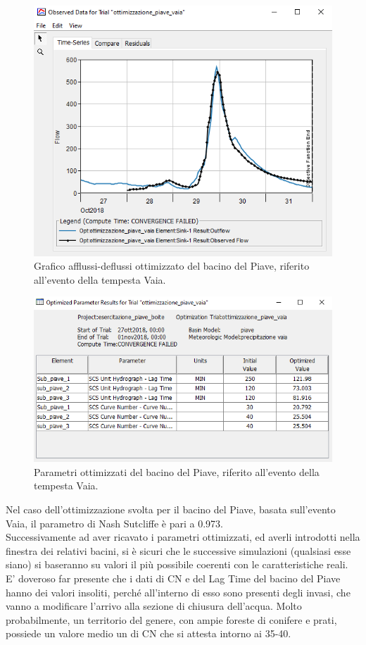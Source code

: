 \begin{figure}[H]\centering
    \includegraphics[scale=1]{immagini/ottim_piave.PNG}
    \caption{Grafico afflussi-deflussi ottimizzato del bacino del Piave, riferito all'evento della tempesta Vaia.}
        \label{ottim_piave}    
\end{figure}

\begin{figure}[H]\centering
    \includegraphics[scale=1]{immagini/par_ottimiz_piave.PNG}
    \caption{Parametri ottimizzati del bacino del Piave, riferito all'evento della tempesta Vaia.}
        \label{par_ottim_boite}    
    \end{figure}

Nel caso dell'ottimizzazione svolta per il bacino del Piave, basata sull'evento Vaia, il parametro di Nash Sutcliffe è pari a 0.973.\\
Successivamente ad aver ricavato i parametri ottimizzati, ed averli introdotti nella finestra dei relativi bacini, si è sicuri che le successive simulazioni (qualsiasi esse siano) si baseranno su valori il più possibile coerenti con le caratteristiche reali.\\
E' doveroso far presente che i dati di CN e del Lag Time del bacino del Piave hanno dei valori insoliti, perché all'interno di esso sono presenti degli invasi, che vanno a modificare l'arrivo alla sezione di chiusura dell'acqua. Molto probabilmente, un territorio del genere, con ampie foreste di conifere e prati, possiede un valore medio un di CN che si attesta intorno ai 35-40.

